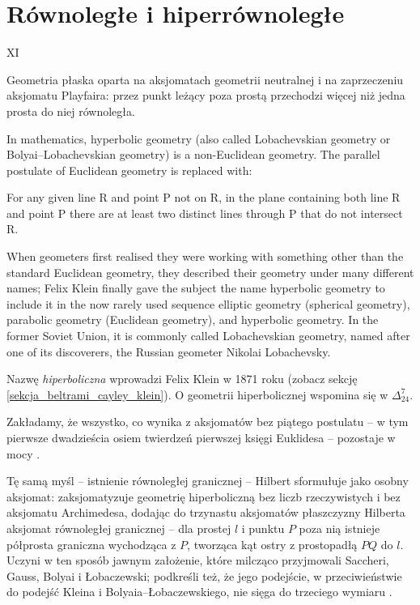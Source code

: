 \color{red}
\section{Równoległe i hiperrównoległe} %
\label{sekcja_hiperboliczna}

XI

\color{red}

\begin{definition}
	Geometria płaska oparta na aksjomatach geometrii neutralnej i na zaprzeczeniu aksjomatu Playfaira: przez punkt leżący poza prostą przechodzi więcej niż jedna prosta do niej równoległa. %
\end{definition}

In mathematics, hyperbolic geometry (also called Lobachevskian geometry or Bolyai–Lobachevskian geometry) is a non-Euclidean geometry. The parallel postulate of Euclidean geometry is replaced with:

    For any given line R and point P not on R, in the plane containing both line R and point P there are at least two distinct lines through P that do not intersect R.

	When geometers first realised they were working with something other than the standard Euclidean geometry, they described their geometry under many different names; Felix Klein finally gave the subject the name hyperbolic geometry to include it in the now rarely used sequence elliptic geometry (spherical geometry), parabolic geometry (Euclidean geometry), and hyperbolic geometry. In the former Soviet Union, it is commonly called Lobachevskian geometry, named after one of its discoverers, the Russian geometer Nikolai Lobachevsky.

Nazwę \emph{hiperboliczna} wprowadzi Felix Klein w 1871 roku (zobacz sekcję \ref{sekcja_beltrami_cayley_klein}). %
O geometrii hiperbolicznej wspomina się w $\Delta_{24}^7$. %

Zakładamy, że wszystko, co wynika z aksjomatów bez piątego postulatu -- w tym pierwsze dwadzieścia osiem twierdzeń pierwszej księgi Euklidesa -- pozostaje w mocy \cite[s. 288, 291]{eves1_1972}. %

Tę samą myśl -- istnienie równoległej granicznej -- Hilbert sformułuje jako osobny aksjomat: zaksjomatyzuje geometrię hiperboliczną bez liczb rzeczywistych i bez aksjomatu Archimedesa, dodając do trzynastu aksjomatów płaszczyzny Hilberta aksjomat równoległej granicznej -- dla prostej $l$ i punktu $P$ poza nią istnieje półprosta graniczna wychodząca z $P$, tworząca kąt ostry z prostopadłą $PQ$ do $l$. %
Uczyni w ten sposób jawnym założenie, które milcząco przyjmowali Saccheri, Gauss, Bolyai i Łobaczewski; podkreśli też, że jego podejście, w przeciwieństwie do podejść Kleina i Bolyaia--Łobaczewskiego, nie sięga do trzeciego wymiaru \cite[s. 209]{greenberg_2010}. %

\color{black}